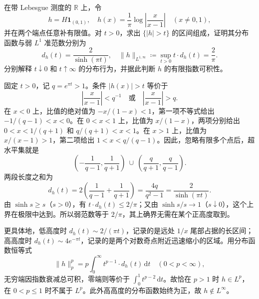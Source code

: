 \begin{exercise}\label{b2:ex:18-new-1}
在带 Lebesgue 测度的 \(\mathbb R\) 上，令
\[
 h=H\mathbf1_{(0,1)},\quad
 h(x)=\frac1\pi\log\left|\frac{x}{x-1}\right|\quad(x\ne0,1),
\]
并在两个端点任意补有限值。对 \(t>0\)，求出 \(\{|h|>t\}\) 的区间组成，证明其分布函数与弱 \(L^1\) 准范数分别为
\[
 d_h(t)=\frac2{\sinh(\pi t)},
 \quad \|h\|_{L^{1,\infty}}
       \coloneqq\sup_{t>0}t\cdot d_h(t)=\frac2\pi.
\]
分别解释 \(t\downarrow0\) 和 \(t\uparrow\infty\) 的分布行为，并据此判断 \(h\) 的有限指数可积性。
\end{exercise}
\begin{solution}
固定 \(t>0\)，记 \(q=e^{\pi t}>1\)。条件 \(|h(x)|>t\) 等价于
\[
 \left|\frac{x}{x-1}\right|<q^{-1}
 \quad\text{或}\quad
 \left|\frac{x}{x-1}\right|>q.
\]
在 \(x<0\) 上，比值的绝对值为 \(-x/(1-x)<1\)，第一项不等式给出
\(-1/(q-1)<x<0\)。在 \(0<x<1\) 上，比值为 \(x/(1-x)\)，两项分别给出
\(0<x<1/(q+1)\) 和 \(q/(q+1)<x<1\)。在 \(x>1\) 上，比值为 \(x/(x-1)>1\)，第二项给出
\(1<x<q/(q-1)\)。因此，忽略有限多个点后，超水平集就是
\[
 \left(-\frac1{q-1},\frac1{q+1}\right)
 \ \cup\
 \left(\frac q{q+1},\frac q{q-1}\right).
\]
两段长度之和为
\[
 d_h(t)=2\left(\frac1{q-1}+\frac1{q+1}\right)
       =\frac{4q}{q^2-1}=\frac2{\sinh(\pi t)}.
\]
由 \(\sinh s\geq s\)（\(s>0\)），有 \(t\cdot d_h(t)\leq2/\pi\)；又由
\(\sinh s/s\to1\)（\(s\downarrow0\)），这个上界在极限中达到。所以弱范数等于 \(2/\pi\)，其上确界无需在某个正高度取到。

更具体地，低高度时 \(d_h(t)\sim2/(\pi t)\)，记录的是远处 \(1/x\) 尾部占据的长区间；高高度时 \(d_h(t)\sim4e^{-\pi t}\)，记录的是两个对数奇点附近迅速缩小的区域。用分布函数恒等式
\[
 \|h\|_p^p=p\int_0^\infty t^{p-1}\cdot d_h(t)\,\mathrm dt
 \quad(0<p<\infty),
\]
无穷端因指数衰减总可积，零端则等价于 \(\int_0^1t^{p-2}\,\mathrm dt\)。故恰在 \(p>1\) 时 \(h\in L^p\)，在 \(0<p\leq1\) 时不属于 \(L^p\)。此外高高度的分布函数始终为正，故 \(h\notin L^\infty\)。
\end{solution}


